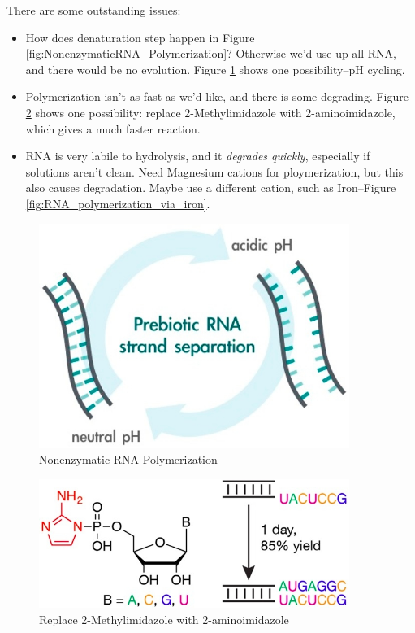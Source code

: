 \documentclass[]{article}
\begin{document}
There are some outstanding issues:
\begin{itemize}
	\item How does denaturation step happen in Figure \ref{fig:NonenzymaticRNA_Polymerization}? Otherwise we'd use up all RNA, and there would be no evolution. Figure \ref{fig:PrebioticRNA_StrandSeparation} shows one possibility--pH cycling.
	\item Polymerization isn't as fast as we'd like, and there is some degrading. Figure \ref{fig:ChangeLeavingGroup} shows one possibility: replace 2-Methylimidazole with 2-aminoimidazole\cite{li2017enhanced}, which gives a much faster reaction.
	\item  RNA is very labile to hydrolysis, and it \textit{degrades quickly}, especially if solutions aren't clean. Need Magnesium cations for ploymerization, but this also causes degradation. Maybe use a different cation, such as Iron--Figure \ref{fig:RNA_polymerization_via_iron}\cite{blain2014progress}.
\end{itemize}

\begin{figure}[H]
	\caption{Nonenzymatic RNA Polymerization}\label{fig:PrebioticRNA_StrandSeparation}
	\includegraphics[width=0.9\textwidth]{PrebioticRNA_StrandSeparation}
\end{figure}

\begin{figure}[H]
	\caption{Replace 2-Methylimidazole with 2-aminoimidazole}\label{fig:ChangeLeavingGroup}
	\includegraphics[width=0.9\textwidth]{ChangeLeavingGroup}
\end{figure}
\end{document}
